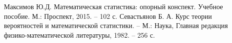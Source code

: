 \documentclass[a4paper,12pt]{article} %
\begin{document}
	
	\tableofcontents \newpage
	\listoffigures \newpage
	
	
	\begin{thebibliography}{99}
		 Максимов Ю.Д. Математическая статистика: опорный конспект. Учебное пособие. М.: Проспект, 2015. -- 102 с.
		 Севастьянов Б. А. Курс теории вероятностей и математической статистики. -- М.: Наука, Главная редакция физико-математической литературы, 1982. -- 256 с.
	\end{thebibliography}
\end{document}
